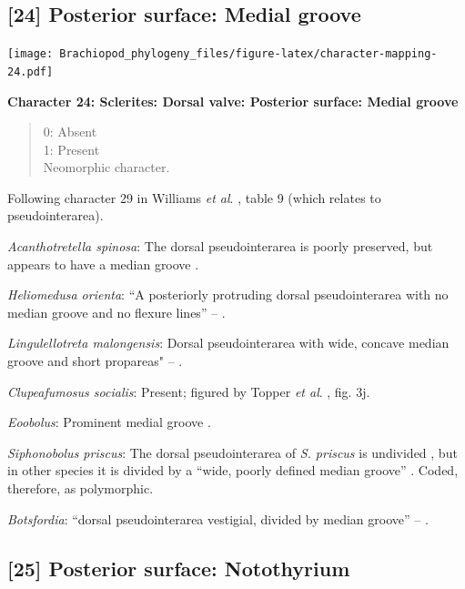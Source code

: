 \documentclass[]{book}
\theoremstyle{definition}
\theoremstyle{definition}
\theoremstyle{definition}
\theoremstyle{remark}
\begin{document}
\hypertarget{posterior-surface-medial-groove}{%
\subsection*{{[}24{]} Posterior surface: Medial
groove}\label{posterior-surface-medial-groove}}

\texttt{[image: Brachiopod\_phylogeny\_files/figure-latex/character-mapping-24.pdf]}

\textbf{Character 24: Sclerites: Dorsal valve: Posterior surface: Medial
groove}

\begin{quote}
0: Absent\\
1: Present\\
Neomorphic character.
\end{quote}

Following character 29 in Williams \emph{et al}.
\citeyearpar{Williams2000BrachiopodaLinguliformea}, table 9 (which
relates to pseudointerarea).

\emph{Acanthotretella spinosa}: The dorsal pseudointerarea is poorly
preserved, but appears to have a median groove
\citep{Holmer2006Aspinose}.

\emph{Heliomedusa orienta}: ``A posteriorly protruding dorsal
pseudointerarea with no median groove and no flexure lines'' --
\citet{Chen2007Reinterpretationof}.

\emph{Lingulellotreta malongensis}: Dorsal pseudointerarea with wide,
concave median groove and short propareas" --
\citet{Williams2000BrachiopodaLinguliformea}.

\emph{Clupeafumosus socialis}: Present; figured by Topper \emph{et al}.
\citeyearpar{Topper2013Reappraisalof}, fig. 3j.

\emph{Eoobolus}: Prominent medial groove
\citep{Balthasar2009Thebrachiopod}.

\emph{Siphonobolus priscus}: The dorsal pseudointerarea of \emph{S.
priscus} is undivided \citep{Popov2009Earlyontogeny}, but in other
species it is divided by a ``wide, poorly defined median groove''
\citep{Williams2000BrachiopodaLinguliformea}. Coded, therefore, as
polymorphic.

\emph{Botsfordia}: ``dorsal pseudointerarea vestigial, divided by median
groove'' -- \citet{Williams2000BrachiopodaLinguliformea}.

\hypertarget{posterior-surface-notothyrium}{%
\subsection*{{[}25{]} Posterior surface:
Notothyrium}\label{posterior-surface-notothyrium}}
\end{document}
